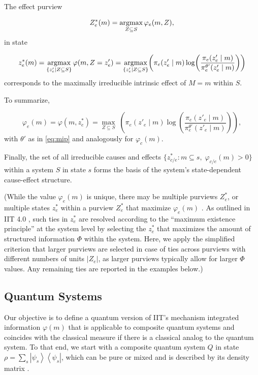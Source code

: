 \documentclass[preprints, article, accept, pdftex, moreauthors, letterpaper]{Definitions/mdpi}
\newcommand{\ket}[1]{\left| #1 \right>} %
\newcommand{\bra}[1]{\left< #1 \right|} %
\renewcommand{\=}[1]{\stackrel{#1}{=}} %
\newcommand{\p}{\theta} %
\renewcommand{\*}{\otimes}%
\newcommand*{\argmax}{\operatornamewithlimits{argmax}\limits}
\begin{document}
The effect purview 

\begin{equation}
\label{eq:Zstar}
Z_e^*(m) = \argmax_{Z \subseteq S} \varphi_e(m, Z), 
\end{equation}
%
in state 

\begin{equation}
z_e^*(m) = \argmax_{\{z_e' | Z \subseteq S\}} \varphi(m, Z= z'_e) = \argmax_{\{z_e' | Z \subseteq S\}} \left( \pi_e(z'_e\mid m) \log \left( \frac{\pi_e(z'_e \mid m)}{\pi_e^{\p'}(z'_e \mid m)} \right) \right)
\end{equation}
%
corresponds to the maximally irreducible intrinsic effect of $M = m$ within $S$. 

To summarize, 

\begin{equation}
\label{eq:phim}
\varphi_e(m) = \varphi(m, z^*_e) = \max_{Z \subseteq S} \; \left( \pi_e(z'_e\mid m) \log \left( \frac{\pi_e(z'_e\mid m)}{\pi_e^{\p'}(z'_e\mid m)} \right) \right),
\end{equation}
%
with $\p'$ as in \eqref{eq:mip} and analogously for $\varphi_c(m)$.

Finally, the set of all irreducible causes and effects $\{z_{c/e}^* : m \subseteq s, \; \varphi_{c/e}(m) > 0\}$ within a system $S$ in state $s$ forms the basis of the system's state-dependent cause-effect structure. 

(While the value $\varphi_e(m)$ is unique, there may be multiple purviews $Z^*_e$, or multiple states $z^*_e$ within a purview $Z^*_e$ that maximize $\varphi_e(m)$ \cite{Krohn2017, Moon2019, Barbosa2021, Albantakis2022_4_0}. As outlined in IIT 4.0 \cite{Albantakis2022_4_0}, such ties in $z_e^*$ are resolved according to the ``maximum existence principle'' at the system level by selecting the $z_e^*$ that maximizes the amount of structured information $\Phi$ within the system. 
Here, we apply the simplified criterion that larger purviews are selected in case of ties across purviews with different numbers of units $|Z_e|$, as larger purviews typically allow for larger $\Phi$ values. Any remaining ties are reported in the examples below.)

\subsection{Quantum Systems}

Our objective is to define a quantum version of IIT's mechanism integrated information $\varphi(m)$ that is applicable to composite quantum systems and coincides with the classical measure \cite{Barbosa2021, Albantakis2022_4_0} if there is a classical analog to the quantum system.
To that end, we start with a composite quantum system $Q$ in state $\rho = \sum_s \ket{\psi_s}\bra{\psi_s}$, which can be pure or mixed and is described by its density matrix \cite{Zanardi2018, Kleiner2021}.
\end{document}
